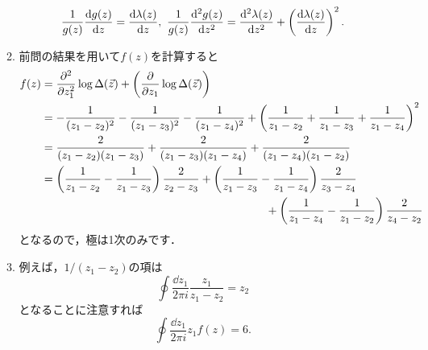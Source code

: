 \documentclass[a4paper,pdflatex,ja=standard]{bxjsarticle}
\begin{document}
\begin{enumerate}
\begin{enumerate}
    \begin{equation}
      \frac{1}{g(z)}\dv{g(z)}{z}
      =
      \dv{\lambda(z)}{z}
      ,\ 
      \frac{1}{g(z)}\dv[2]{g(z)}{z}      
      =
      \dv[2]{\lambda(z)}{z}
      +
      \left( \dv{\lambda(z)}{z} \right)^2
      .
    \end{equation}


    \item 

    前問の結果を用いて$f(z)$を計算すると
    \begin{align}
      f(z)
      &=
      \pdv[2]{}{z_1}\log \Delta(\vec{z})
      +
      \left(  
        \pdv{}{z_1}\log \Delta(\vec{z})
      \right)
      \nonumber
      \\
      &=
      -
      \frac{1}{(z_1-z_2)^2}
      -
      \frac{1}{(z_1-z_3)^2}
      -
      \frac{1}{(z_1-z_4)^2}
      +
      \left(  
        \frac{1}{z_1-z_2}
        +
        \frac{1}{z_1-z_3}
        +
        \frac{1}{z_1-z_4}
      \right)^2
      \nonumber
      \\
      &=
      \frac{2}{(z_1-z_2)(z_1-z_3)}
      +
      \frac{2}{(z_1-z_3)(z_1-z_4)}
      +
      \frac{2}{(z_1-z_4)(z_1-z_2)}
      \nonumber
      \\
      &=
      \left( \frac{1}{z_1-z_2}-\frac{1}{z_1-z_3} \right)\frac{2}{z_2-z_3}
      +
      \left( \frac{1}{z_1-z_3}-\frac{1}{z_1-z_4} \right)\frac{2}{z_3-z_4}
      \nonumber
      \\
      &\hspace{7cm}
      +
      \left( \frac{1}{z_1-z_4}-\frac{1}{z_1-z_2} \right)\frac{2}{z_4-z_2}
    \end{align}
    となるので，極は1次のみです．


    \item 

    例えば，$1/(z_1-z_2)$の項は
    \begin{equation}
      \oint\frac{\dd z_1}{2\pi i}
      \frac{z_1}{z_1-z_2}
      =
      z_2
    \end{equation}
    となることに注意すれば
    \begin{equation}
      \oint\frac{\dd z_1}{2\pi i}
      z_1f(z)
      =
      6
      .
    \end{equation}

  \end{enumerate}


\end{enumerate}
\end{document}

